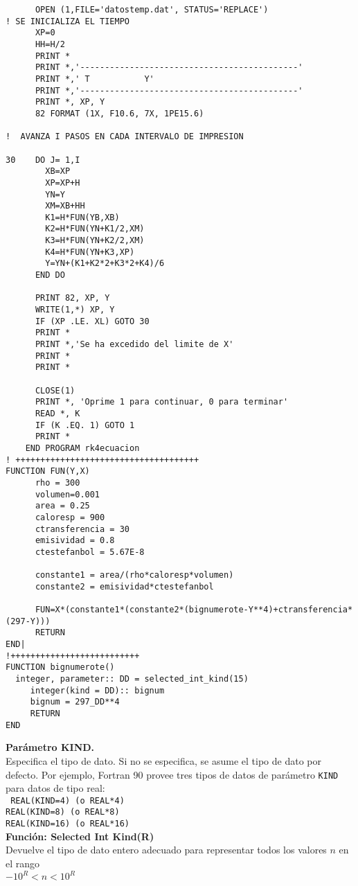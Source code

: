 \documentclass[11pt]{article}
\begin{document}
\begin{enumerate}
\begin{lstlisting}
      OPEN (1,FILE='datostemp.dat', STATUS='REPLACE')
! SE INICIALIZA EL TIEMPO
      XP=0
      HH=H/2
      PRINT *
      PRINT *,'--------------------------------------------'
      PRINT *,'	T			Y'
      PRINT *,'--------------------------------------------'
      PRINT *, XP, Y
      82 FORMAT (1X, F10.6, 7X, 1PE15.6)

!  AVANZA I PASOS EN CADA INTERVALO DE IMPRESION
      
30    DO J= 1,I
	  	XB=XP
	  	XP=XP+H
	  	YN=Y
	  	XM=XB+HH
	  	K1=H*FUN(YB,XB)
	  	K2=H*FUN(YN+K1/2,XM)
	  	K3=H*FUN(YN+K2/2,XM)
	  	K4=H*FUN(YN+K3,XP)
	  	Y=YN+(K1+K2*2+K3*2+K4)/6
      END DO

      PRINT 82, XP, Y
      WRITE(1,*) XP, Y
      IF (XP .LE. XL) GOTO 30
      PRINT *
      PRINT *,'Se ha excedido del limite de X'
      PRINT *
      PRINT *
      
      CLOSE(1)
      PRINT *, 'Oprime 1 para continuar, 0 para terminar'
      READ *, K
      IF (K .EQ. 1) GOTO 1
      PRINT *
	END PROGRAM rk4ecuacion
! +++++++++++++++++++++++++++++++++++++
FUNCTION FUN(Y,X)
      rho = 300
      volumen=0.001
      area = 0.25
      caloresp = 900
      ctransferencia = 30
      emisividad = 0.8
      ctestefanbol = 5.67E-8
     
      constante1 = area/(rho*caloresp*volumen)
      constante2 = emisividad*ctestefanbol

      FUN=X*(constante1*(constante2*(bignumerote-Y**4)+ctransferencia*(297-Y)))
      RETURN
END|
!++++++++++++++++++++++++++
FUNCTION bignumerote()
  integer, parameter:: DD = selected_int_kind(15)
     integer(kind = DD):: bignum
     bignum = 297_DD**4
     RETURN
END
\end{lstlisting}
\end{enumerate}
\textbf{Parámetro KIND.}\\
Especifica el tipo de dato. Si no se especifica, se asume el tipo de dato por defecto. Por ejemplo, Fortran 90 provee tres tipos de datos de parámetro \texttt{KIND} para datos de tipo real:\\
\texttt{
REAL(KIND=4) (o REAL*4)\\
REAL(KIND=8) (o REAL*8)\\
REAL(KIND=16) (o REAL*16)\\
}
\textbf{Función: Selected Int Kind(R)}\\
Devuelve el tipo de dato entero adecuado para representar todos los valores $n$ en el rango\\ $-10^{R} < n <10^R$\\
\end{document}
